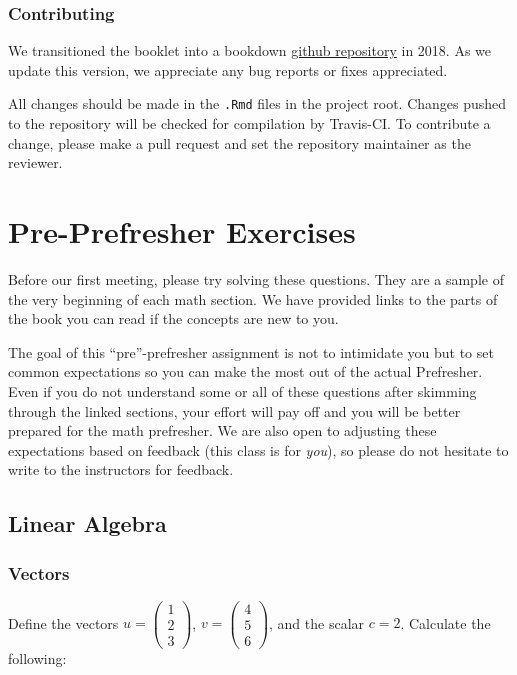 \documentclass[]{book}
\theoremstyle{definition}
\theoremstyle{definition}
\theoremstyle{definition}
\theoremstyle{remark}
\begin{document}
\subsection*{Contributing}\label{contributing}

We transitioned the booklet into a bookdown
\href{https://github.com/IQSS/prefresher}{github repository} in 2018. As
we update this version, we appreciate any bug reports or fixes
appreciated.

All changes should be made in the \texttt{.Rmd} files in the project
root. Changes pushed to the repository will be checked for compilation
by Travis-CI. To contribute a change, please make a pull request and set
the repository maintainer as the reviewer.

\chapter*{Pre-Prefresher Exercises}\label{pre-prefresher-exercises}

Before our first meeting, please try solving these questions. They are a
sample of the very beginning of each math section. We have provided
links to the parts of the book you can read if the concepts are new to
you.

The goal of this ``pre''-prefresher assignment is not to intimidate you
but to set common expectations so you can make the most out of the
actual Prefresher. Even if you do not understand some or all of these
questions after skimming through the linked sections, your effort will
pay off and you will be better prepared for the math prefresher. We are
also open to adjusting these expectations based on feedback (this class
is for \emph{you}), so please do not hesitate to write to the
instructors for feedback.

\section*{Linear Algebra}\label{linear-algebra}

\subsection*{Vectors}\label{vectors}

Define the vectors \(u = \begin{pmatrix} 1 \\2 \\3 \end{pmatrix}\),
\(v = \begin{pmatrix} 4\\5\\6 \end{pmatrix}\), and the scalar \(c = 2\).
Calculate the following:
\end{document}

